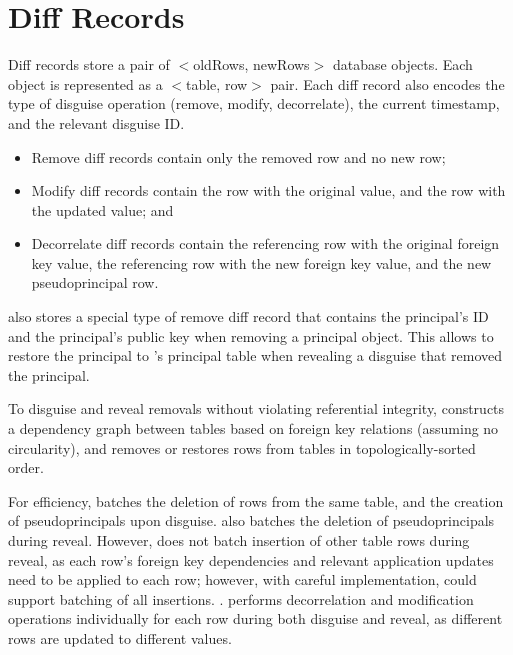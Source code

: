 \section{Diff Records}
Diff records store a pair of $<$oldRows, newRows$>$ database objects.  Each
object is represented as a $<$table, row$>$ pair.  Each diff record also encodes
the type of disguise operation (remove, modify, decorrelate), the current
timestamp, and the relevant
disguise ID.

\begin{itemize}[nosep]
    \item Remove diff records contain only the removed row and no 
        new row;
    \item Modify diff records contain the row with the original value, and the
        row with the updated value; and
    \item Decorrelate diff records contain the referencing row with the original
        foreign key value, the referencing row with the new foreign key value,
        and the new pseudoprincipal row.
\end{itemize}

\sys also stores a special type of remove diff record that contains the
principal's ID and the principal's public key when removing a principal object.
This allows \sys to restore the principal to \sys's principal table when revealing
a disguise that removed the principal.

To disguise and reveal removals without violating referential integrity, \sys
constructs a dependency graph between tables based on foreign key relations
(assuming no circularity), and removes or restores rows from tables in
topologically-sorted order.
%

%
For efficiency, \sys batches the deletion of rows from the same table, and the
creation of pseudoprincipals upon disguise. 
%
\sys also batches the deletion of pseudoprincipals during reveal. However, \sys
does not batch insertion of other table rows during reveal, as each row's
foreign key dependencies and relevant application updates need to be applied to
each row; however, with careful implementation, \sys could support batching of
all insertions.  .
%
\sys performs decorrelation and modification operations individually for each
row during both disguise and reveal, as different rows are updated to different
values.
%

